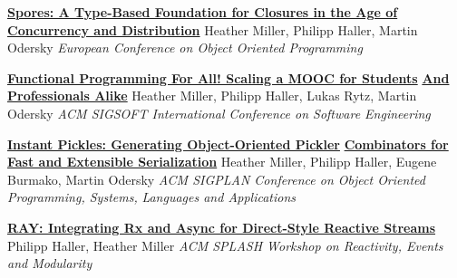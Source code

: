 \documentclass[9pt]{article}
\begin{document}
\noindent\href{http://infoscience.epfl.ch/record/191239}{\bf Spores: A Type-Based Foundation for Closures in the Age of}\vspace{-0.03in}
\newline\noindent\href{http://infoscience.epfl.ch/record/191239}{\bf Concurrency and Distribution}
\newline\noindent Heather Miller, Philipp Haller, Martin Odersky
\newline\noindent\emph{European Conference on Object Oriented Programming}
\bigskip

\noindent\href{http://infoscience.epfl.ch/record/190022}{\bf Functional Programming For All! Scaling a MOOC for Students}\vspace{-0.03in}
\newline\noindent\href{http://infoscience.epfl.ch/record/190022}{\bf And Professionals Alike}
\newline\noindent Heather Miller, Philipp Haller, Lukas Rytz, Martin Odersky
\newline\noindent\emph{ACM SIGSOFT International Conference on Software Engineering}
\bigskip

\noindent\href{http://infoscience.epfl.ch/record/188383}{\bf Instant Pickles: Generating Object-Oriented Pickler}\vspace{-0.03in}
\newline\noindent\href{http://infoscience.epfl.ch/record/188383}{\bf Combinators for Fast and Extensible Serialization}
\newline\noindent Heather Miller, Philipp Haller, Eugene Burmako, Martin Odersky
\newline\noindent\emph{ACM SIGPLAN Conference on Object Oriented Programming, Systems,}
\newline\noindent\emph{Languages and Applications}
\bigskip

\noindent\href{http://infoscience.epfl.ch/record/188383}{\bf RAY: Integrating Rx and Async for Direct-Style Reactive Streams}
\newline\noindent Philipp Haller, Heather Miller
\newline\noindent\emph{ACM SPLASH Workshop on Reactivity, Events and Modularity}
\bigskip
\end{document}
